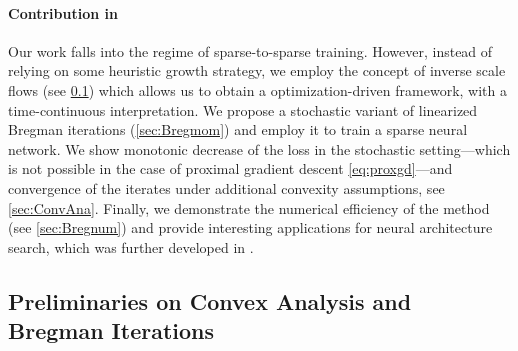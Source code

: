 \paragraph{Contribution in \cite{bungert2022bregman}}
%
Our work falls into the regime of sparse-to-sparse training. However, instead of relying on some heuristic growth strategy, we employ the concept of inverse scale flows (see \cref{sec:convprelim}) which allows us to obtain a optimization-driven framework, with a time-continuous interpretation. We propose a stochastic variant of linearized Bregman iterations (\cref{sec:Bregmom}) and employ it to train a sparse neural network. We show monotonic decrease of the loss in the stochastic setting---which is not possible in the case of proximal gradient descent \cref{eq:proxgd}---and convergence of the iterates under additional convexity assumptions, see \cref{sec:ConvAna}. Finally, we demonstrate the numerical efficiency of the method (see \cref{sec:Bregnum}) and provide interesting applications for neural architecture search, which was further developed in \cite{bungert2021neural}.


\subsection{Preliminaries on Convex Analysis and Bregman Iterations}\label{sec:convprelim}

